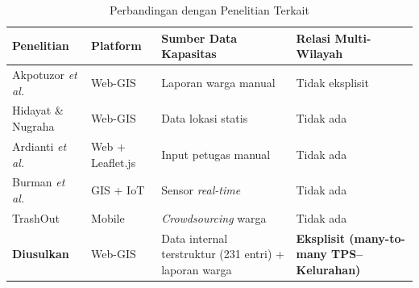 \documentclass[conference]{IEEEtran}
\begin{document}
\begin{table}[h]
    \caption{Perbandingan dengan Penelitian Terkait}
    \label{tab:pustaka}
    \centering
    \begin{tabular}{p{1.5cm}p{1.4cm}p{2.1cm}p{2.2cm}}
        \hline
        \textbf{Penelitian}                            & \textbf{Platform} & \textbf{Sumber Data Kapasitas}                        & \textbf{Relasi Multi-Wilayah}                    \\
        \hline
        Akpotuzor \textit{et al.} \cite{akpotuzor2020} & Web-GIS           & Laporan warga manual                                  & Tidak eksplisit                                  \\
        \hline
        Hidayat \& Nugraha \cite{hidayat2023}          & Web-GIS           & Data lokasi statis                                    & Tidak ada                                        \\
        \hline
        Ardianti \textit{et al.} \cite{ardianti2025}   & Web + Leaflet.js  & Input petugas manual                                  & Tidak ada                                        \\
        \hline
        Burman \textit{et al.} \cite{burman2022}       & GIS + IoT         & Sensor \textit{real-time}                             & Tidak ada                                        \\
        \hline
        TrashOut \cite{trashout}                       & Mobile            & \textit{Crowdsourcing} warga                          & Tidak ada                                        \\
        \hline
        \textbf{Diusulkan}                             & Web-GIS           & Data internal terstruktur (231 entri) + laporan warga & \textbf{Eksplisit (many-to-many TPS--Kelurahan)} \\
        \hline
    \end{tabular}
\end{table}
\end{document}
